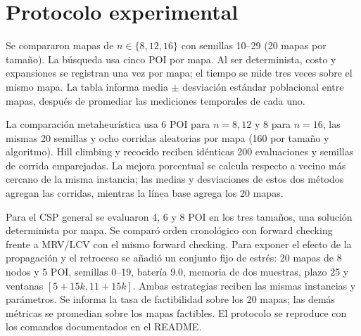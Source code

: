 \documentclass[10pt,spanish]{article}
\begin{document}
\section{Protocolo experimental}
Se compararon mapas de $n\in\{8,12,16\}$ con semillas 10--29 (20 mapas por tamaño). La búsqueda usa cinco POI por mapa. Al ser determinista, costo y expansiones se registran una vez por mapa; el tiempo se mide tres veces sobre el mismo mapa. La tabla informa media $\pm$ desviación estándar poblacional entre mapas, después de promediar las mediciones temporales de cada uno.

La comparación metaheurística usa 6 POI para $n=8,12$ y 8 para $n=16$, las mismas 20 semillas y ocho corridas aleatorias por mapa (160 por tamaño y algoritmo). Hill climbing y recocido reciben idénticas 200 evaluaciones y semillas de corrida emparejadas. La mejora porcentual se calcula respecto a vecino más cercano de la misma instancia; las medias y desviaciones de estos dos métodos agregan las corridas, mientras la línea base agrega los 20 mapas.

Para el CSP general se evaluaron 4, 6 y 8 POI en los tres tamaños, una solución determinista por mapa. Se comparó orden cronológico con forward checking frente a MRV/LCV con el mismo forward checking. Para exponer el efecto de la propagación y el retroceso se añadió un conjunto fijo de estrés: 20 mapas de 8 nodos y 5 POI, semillas 0--19, batería 9.0, memoria de dos muestras, plazo 25 y ventanas $[5+15k,11+15k]$. Ambas estrategias reciben las mismas instancias y parámetros. Se informa la tasa de factibilidad sobre los 20 mapas; las demás métricas se promedian sobre los mapas factibles. El protocolo se reproduce con los comandos documentados en el README.
\end{document}
